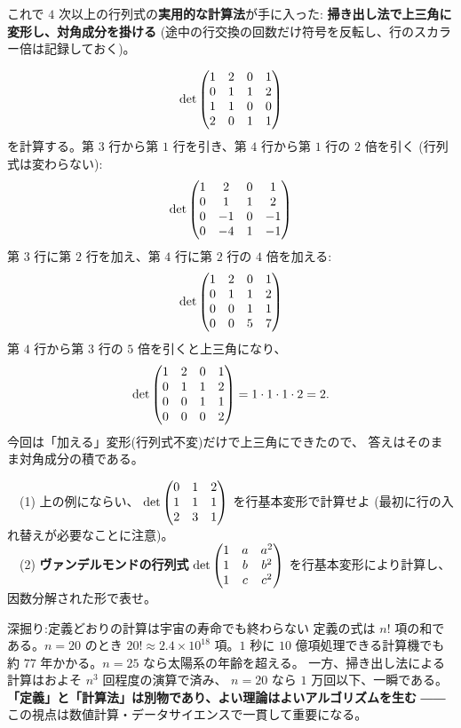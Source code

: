 これで $4$ 次以上の行列式の\textbf{実用的な計算法}が手に入った:
\textbf{掃き出し法で上三角に変形し、対角成分を掛ける}
(途中の行交換の回数だけ符号を反転し、行のスカラー倍は記録しておく)。

\begin{rei}[$4$ 次の行列式の計算]\label{rei:gendet-4x4}
\[
\det \begin{pmatrix}1 & 2 & 0 & 1 \\ 0 & 1 & 1 & 2 \\ 1 & 1 & 0 & 0 \\ 2 & 0 & 1 & 1\end{pmatrix}
\]
を計算する。第 $3$ 行から第 $1$ 行を引き、第 $4$ 行から第 $1$ 行の $2$ 倍を引く
(行列式は変わらない):
\[
\det \begin{pmatrix}1 & 2 & 0 & 1 \\ 0 & 1 & 1 & 2 \\ 0 & -1 & 0 & -1 \\ 0 & -4 & 1 & -1\end{pmatrix}
\]
第 $3$ 行に第 $2$ 行を加え、第 $4$ 行に第 $2$ 行の $4$ 倍を加える:
\[
\det \begin{pmatrix}1 & 2 & 0 & 1 \\ 0 & 1 & 1 & 2 \\ 0 & 0 & 1 & 1 \\ 0 & 0 & 5 & 7\end{pmatrix}
\]
第 $4$ 行から第 $3$ 行の $5$ 倍を引くと上三角になり、
\[
\det \begin{pmatrix}1 & 2 & 0 & 1 \\ 0 & 1 & 1 & 2 \\ 0 & 0 & 1 & 1 \\ 0 & 0 & 0 & 2\end{pmatrix}
= 1 \cdot 1 \cdot 1 \cdot 2 = 2.
\]
今回は「加える」変形(行列式不変)だけで上三角にできたので、
答えはそのまま対角成分の積である。
\end{rei}

\begin{mondai}\label{q:det4}
　(1) 上の例にならい、
$\det \begin{pmatrix}0 & 1 & 2 \\ 1 & 1 & 1 \\ 2 & 3 & 1\end{pmatrix}$ を行基本変形で計算せよ
(最初に行の入れ替えが必要なことに注意)。\\
　(2) \textbf{ヴァンデルモンドの行列式}
$\det \begin{pmatrix}1 & a & a^2 \\ 1 & b & b^2 \\ 1 & c & c^2\end{pmatrix}$
を行基本変形により計算し、因数分解された形で表せ。
\end{mondai}

\begin{itembox}[l]{深掘り:定義どおりの計算は宇宙の寿命でも終わらない}
定義の式は $n!$ 項の和である。$n = 20$ のとき
$20! \approx 2.4 \times 10^{18}$ 項。$1$ 秒に $10$ 億項処理できる計算機でも
約 $77$ 年かかる。$n = 25$ なら太陽系の年齢を超える。
一方、掃き出し法による計算はおよそ $n^3$ 回程度の演算で済み、
$n = 20$ なら $1$ 万回以下、一瞬である。
\textbf{「定義」と「計算法」は別物であり、よい理論はよいアルゴリズムを生む}
――この視点は数値計算・データサイエンスで一貫して重要になる。
\end{itembox}

